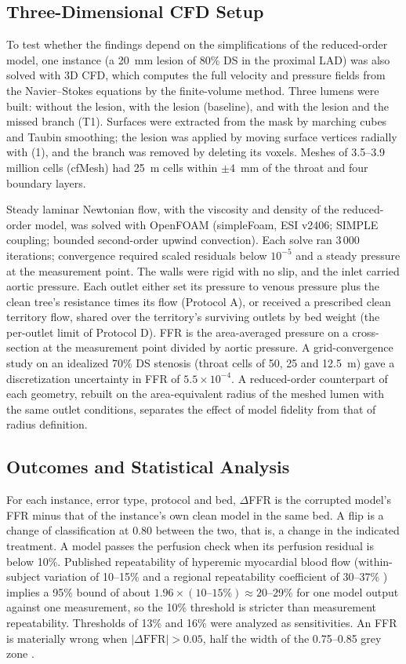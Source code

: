 \documentclass[journal,twoside,web]{ieeecolor}
\begin{document}
\subsection{Three-Dimensional CFD Setup}
To test whether the findings depend on the simplifications of the reduced-order model, one instance (a 20~mm lesion
of 80\% DS in the proximal LAD) was also solved with 3D CFD, which computes the full velocity and pressure fields
from the Navier--Stokes equations by the finite-volume method. Three lumens were built: without the lesion, with the lesion (baseline), and with the
lesion and the missed branch (T1). Surfaces were extracted from the mask by marching cubes and Taubin smoothing; the
lesion was applied by moving surface vertices radially with (1), and the branch was removed by deleting its voxels.
Meshes of 3.5--3.9 million cells (cfMesh) had 25~\textmu m cells within $\pm 4$~mm of the throat and four boundary
layers.

Steady laminar Newtonian flow, with the viscosity and density of the reduced-order model, was solved with OpenFOAM
(simpleFoam, ESI v2406; SIMPLE coupling; bounded second-order upwind convection). Each solve ran
3\,000 iterations; convergence required scaled residuals below $10^{-5}$ and a steady pressure at the measurement
point. The walls were rigid with no slip, and the inlet carried aortic pressure. Each outlet either set its pressure
to venous pressure plus the clean tree's resistance times its flow (Protocol A), or received a prescribed clean
territory flow, shared over the territory's surviving outlets by bed weight (the per-outlet limit of Protocol D). FFR
is the area-averaged pressure on a cross-section at the measurement point divided by aortic pressure. A
grid-convergence study on an idealized 70\% DS stenosis (throat cells of 50, 25 and 12.5~\textmu m) gave a
discretization uncertainty in FFR of $5.5\times10^{-4}$. A reduced-order counterpart of each geometry, rebuilt on the
area-equivalent radius of the meshed lumen with the same outlet conditions, separates the effect of model fidelity
from that of radius definition.

\subsection{Outcomes and Statistical Analysis}
For each instance, error type, protocol and bed, $\Delta$FFR is the corrupted model's FFR minus that of the
instance's own clean model in the same bed. A flip is a change of classification at 0.80 between the two, that is,
a change in the indicated treatment. A model passes the perfusion check when its perfusion residual is below 10\%.
Published repeatability of hyperemic myocardial blood flow (within-subject variation of 10--15\%
\cite{schindler2023} and a regional repeatability coefficient of 30--37\% \cite{brown2018}) implies a 95\% bound of
about $1.96 \times (10\text{--}15\%) \approx 20$--29\% for one model output against one measurement, so the 10\% threshold is stricter than measurement repeatability. Thresholds of 13\% and 16\% were analyzed as
sensitivities. An FFR is materially wrong when $|\Delta\mathrm{FFR}| > 0.05$, half the width of the 0.75--0.85 grey zone
\cite{petraco2013}.
\end{document}

